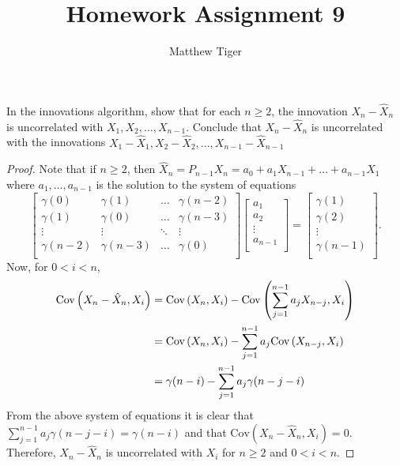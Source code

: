 \documentclass[12pt]{article}
\title{Homework Assignment 9}
\author{Matthew Tiger}
\theoremstyle{definition}
\newenvironment{custompbm}[1]
  {\renewcommand\theproblem{#1}\problem}
  {\endproblem}
\newcommand{\Co}[2]{\text{Cov}\left({#1}, {#2}\right)}
\begin{document}
\maketitle


\begin{custompbm}{2.20}
  In the innovations algorithm, show that for each $n\geq 2$, the innovation
  $X_n - \hat{X}_n$ is uncorrelated with $X_1, X_2, \dots, X_{n-1}$. Conclude that
  $X_n - \hat{X}_n$ is uncorrelated with the innovations
  $X_1 - \hat{X}_1, X_2 - \hat{X}_2, \dots, X_{n-1} - \hat{X}_{n-1}$
\end{custompbm}

\begin{proof}
  Note that if $n \geq 2$, then $\hat{X}_n = P_{n-1}X_n = a_0 + a_1 X_{n-1} + \dots + a_{n-1}X_{1}$
  where $a_1, \dots, a_{n-1}$ is the solution to the system of equations
  \[
    \begin{bmatrix}
      \gamma(0) & \gamma(1) & \hdots & \gamma(n-2) \\
      \gamma(1) & \gamma(0) & \hdots & \gamma(n-3) \\
      \vdots & \vdots & \ddots & \vdots \\
      \gamma(n-2) & \gamma(n-3) & \hdots & \gamma(0) \\
    \end{bmatrix}
    \begin{bmatrix}
      a_1 \\
      a_2 \\
      \vdots \\
      a_{n-1} \\
    \end{bmatrix}
    =
    \begin{bmatrix}
      \gamma(1) \\
      \gamma(2) \\
      \vdots \\
      \gamma(n-1) \\
    \end{bmatrix}.
  \]
  Now, for $0 < i < n$,
  \begin{align}\label{sum}
    \Co{X_n - \hat{X}_n}{X_i} &= \Co{X_n}{X_i} - \Co{\sum_{j=1}^{n-1} a_j X_{n-j}}{X_i} \notag\\
    &= \Co{X_n}{X_i} - \sum_{j=1}^{n-1} a_j \Co{X_{n-j}}{X_i} \notag \\
    &= \gamma(n-i) - \sum_{j=1}^{n-1} a_j \gamma(n-j-i)
  \end{align}
  From the above system of equations it is clear that $\sum_{j=1}^{n-1} a_j \gamma(n-j-i) = \gamma(n-i)$
  and that $\Co{X_n - \hat{X}_n}{X_i} = 0$. Therefore,
  $X_n - \hat{X}_n$ is uncorrelated with $X_i$ for $n\geq 2$ and $0 < i < n$.


\end{proof}
\end{document}
